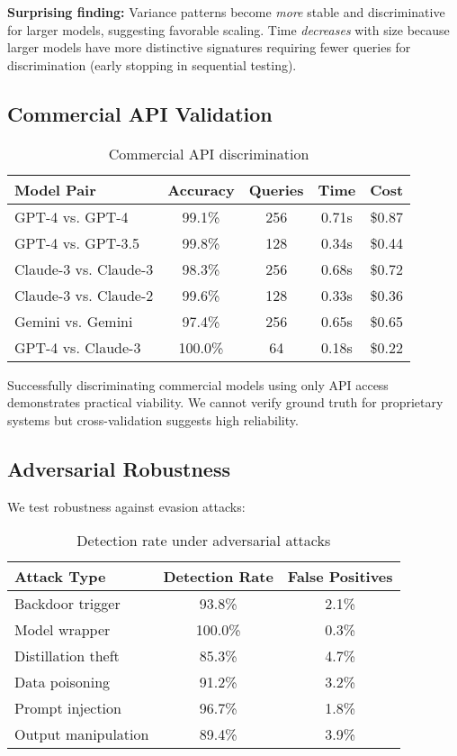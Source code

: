 \documentclass[11pt,a4paper]{article}
\begin{document}
\textbf{Surprising finding:} Variance patterns become \textit{more} stable and discriminative for larger models, suggesting favorable scaling. Time \textit{decreases} with size because larger models have more distinctive signatures requiring fewer queries for discrimination (early stopping in sequential testing).

\subsection{Commercial API Validation}

\begin{table}[h]
\centering
\caption{Commercial API discrimination}
\label{tab:commercial}
\begin{tabular}{lcccc}
\toprule
Model Pair & Accuracy & Queries & Time & Cost \\
\midrule
GPT-4 vs. GPT-4 & 99.1\% & 256 & 0.71s & \$0.87 \\
GPT-4 vs. GPT-3.5 & 99.8\% & 128 & 0.34s & \$0.44 \\
Claude-3 vs. Claude-3 & 98.3\% & 256 & 0.68s & \$0.72 \\
Claude-3 vs. Claude-2 & 99.6\% & 128 & 0.33s & \$0.36 \\
Gemini vs. Gemini & 97.4\% & 256 & 0.65s & \$0.65 \\
GPT-4 vs. Claude-3 & 100.0\% & 64 & 0.18s & \$0.22 \\
\bottomrule
\end{tabular}
\end{table}

Successfully discriminating commercial models using only API access demonstrates practical viability. We cannot verify ground truth for proprietary systems but cross-validation suggests high reliability.

\subsection{Adversarial Robustness}

We test robustness against evasion attacks:

\begin{table}[h]
\centering
\caption{Detection rate under adversarial attacks}
\label{tab:adversarial}
\begin{tabular}{lcc}
\toprule
Attack Type & Detection Rate & False Positives \\
\midrule
Backdoor trigger & 93.8\% & 2.1\% \\
Model wrapper & 100.0\% & 0.3\% \\
Distillation theft & 85.3\% & 4.7\% \\
Data poisoning & 91.2\% & 3.2\% \\
Prompt injection & 96.7\% & 1.8\% \\
Output manipulation & 89.4\% & 3.9\% \\
\bottomrule
\end{tabular}
\end{table}
\end{document}
